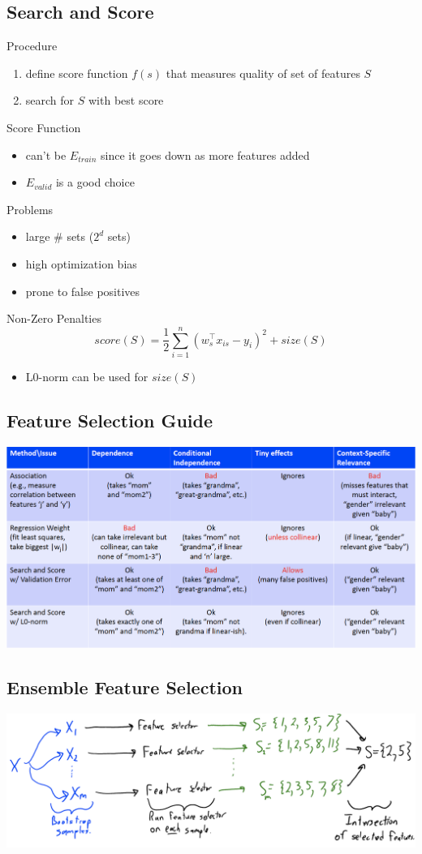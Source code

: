 \documentclass[10pt,landscape,a4paper]{article}
\begin{document}
\begin{multicols*}{5}
\subsection{Search and Score}
Procedure
\begin{enumerate}
    \item define score function \(f(s)\) that measures quality of set of features \(S\)
    \item search for \(S\) with best score
\end{enumerate}
Score Function
\begin{itemize}
    \item can't be \(E_{train}\) since it goes down as more features added
    \item \(E_{valid}\) is a good choice
\end{itemize}
Problems
\begin{itemize}
    \item large \# sets (\(2^d\) sets)
    \item high optimization bias
    \item prone to false positives
\end{itemize}
Non-Zero Penalties
\begin{dmath*}
    score(S) = \frac{1}{2} \sum_{i=1}^{n} (w_s^\intercal x_{is} - y_i)^2 + size(S)
\end{dmath*}
\begin{itemize}
    \item L0-norm can be used for \(size(S)\)
\end{itemize}

\subsection{Feature Selection Guide}
\includegraphics[scale=0.12]{feature_selection_guide}

\subsection{Ensemble Feature Selection}
\includegraphics[scale=0.12]{ensemble_feature_selection}


\end{multicols*}
\end{document}
